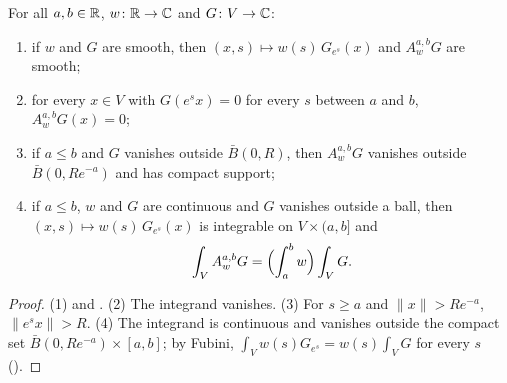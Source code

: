 \begin{lemma}
\label{lem:weighted-dilation}
\leanok
{}
For all $a, b \in \mathbb{R}$, $w \colon \mathbb{R} \to \mathbb{C}$ and $G \colon V \to \mathbb{C}$:
\begin{enumerate}
  \item if $w$ and $G$ are smooth, then $(x, s) \mapsto w(s) \, G_{e^s}(x)$ and $A^{a,b}_w G$ are
    smooth;
  \item for every $x \in V$ with $G(e^s x) = 0$ for every $s$ between $a$ and $b$,
    $A^{a,b}_w G(x) = 0$;
  \item if $a \leq b$ and $G$ vanishes outside $\bar B(0, R)$, then $A^{a,b}_w G$ vanishes
    outside $\bar B(0, R e^{-a})$ and has compact support;
  \item if $a \leq b$, $w$ and $G$ are continuous and $G$ vanishes outside a ball, then
    $(x, s) \mapsto w(s) \, G_{e^s}(x)$ is integrable on $V \times (a, b]$ and
    \[
      \int_V A^{a,b}_w G = \Bigl(\int_a^b w\Bigr) \int_V G .
    \]
\end{enumerate}
\end{lemma}

\begin{proof}
\leanok
(1)  and . (2) The integrand
vanishes. (3) For $s \geq a$ and $\|x\| > R e^{-a}$, $\|e^s x\| > R$. (4) The integrand is
continuous and vanishes outside the compact set $\bar B(0, R e^{-a}) \times [a, b]$; by Fubini,
$\int_V w(s) G_{e^s} = w(s) \int_V G$ for every $s$ ().
\end{proof}

